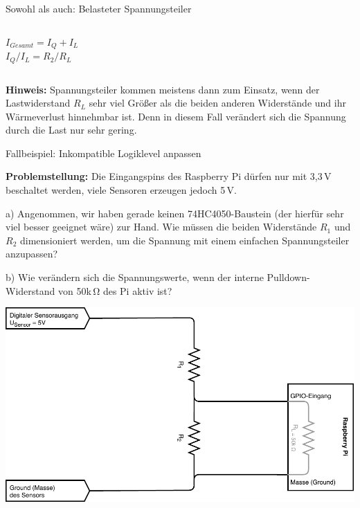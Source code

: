 {\begin{frame}{Sowohl als auch: Belasteter Spannungsteiler}
\begin{columns}
        \bigskip

        $I_{Gesamt} = I_Q + I_L$ \\
        \smallskip
        $I_Q / I_L = R_2 / R_L$ \\
    \end{columns}

    \bigskip

    \parbox{\linewidth}{
        \footnotesize
        \textbf{Hinweis:} Spannungsteiler kommen meistens dann zum Einsatz, wenn der
        Lastwiderstand $R_L$ sehr viel Größer als die beiden anderen Widerstände und
        ihr Wärmeverlust hinnehmbar ist. Denn in diesem Fall verändert sich die Spannung
        durch die Last nur sehr gering.
    }
\end{frame}
}

{
\footnotesize

\begin{frame}{Fallbeispiel: Inkompatible Logiklevel anpassen}
    \parbox{\textwidth}{
        \textbf{Problemstellung:} Die Eingangspins des Raspberry Pi dürfen nur mit
        3,3\,V beschaltet werden, viele Sensoren erzeugen jedoch 5\,V.
    }

    \smallskip

    \parbox{\textwidth}{
        a) Angenommen, wir haben gerade keinen 74HC4050-Baustein (der hierfür sehr
        viel besser geeignet wäre) zur Hand. Wie müssen die beiden Widerstände
        $R_1$ und $R_2$ dimensioniert werden, um die Spannung mit einem einfachen
        Spannungsteiler anzupassen?
    }

    \smallskip

    \parbox{\textwidth}{
        b) Wie verändern sich die Spannungswerte, wenn der interne Pulldown-Widerstand von
        50k\,\si{\ohm} des Pi aktiv ist?
    }

    \begin{center}
        \includegraphics[width=.7\textwidth]{2-hardwaredesign/img/spannungsteiler_beispiel}
    \end{center}


\end{frame}}
